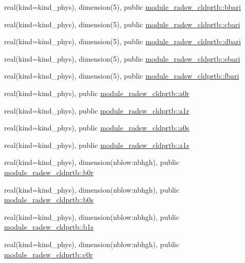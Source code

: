\begin{DoxyCompactItemize}
\item 
real(kind=kind\+\_\+phys), dimension(5), public \hyperlink{group__module__radsw__main_gad5342321ccd4759cb70f7a673620ee19}{module\+\_\+radsw\+\_\+cldprtb\+::bbari}
\item 
real(kind=kind\+\_\+phys), dimension(5), public \hyperlink{group__module__radsw__main_gae7f1de5c9736894ac7b54c0e0d312f16}{module\+\_\+radsw\+\_\+cldprtb\+::cbari}
\item 
real(kind=kind\+\_\+phys), dimension(5), public \hyperlink{group__module__radsw__main_gaf8b02590603ea2f838d954cb0a93bbeb}{module\+\_\+radsw\+\_\+cldprtb\+::dbari}
\item 
real(kind=kind\+\_\+phys), dimension(5), public \hyperlink{group__module__radsw__main_ga3cc7ab844ca564bd3df02a687bbc2f43}{module\+\_\+radsw\+\_\+cldprtb\+::ebari}
\item 
real(kind=kind\+\_\+phys), dimension(5), public \hyperlink{group__module__radsw__main_gac2e5b61aea6effe7d49586bf5223c154}{module\+\_\+radsw\+\_\+cldprtb\+::fbari}
\item 
real(kind=kind\+\_\+phys), public \hyperlink{group__module__radsw__main_ga0fdb9425031a10735e11d7f5c9e0376e}{module\+\_\+radsw\+\_\+cldprtb\+::a0r}
\item 
real(kind=kind\+\_\+phys), public \hyperlink{group__module__radsw__main_ga9826a0616c434620200ce4652b5af800}{module\+\_\+radsw\+\_\+cldprtb\+::a1r}
\item 
real(kind=kind\+\_\+phys), public \hyperlink{group__module__radsw__main_ga81ba576e28e5844772d040ff7543faae}{module\+\_\+radsw\+\_\+cldprtb\+::a0s}
\item 
real(kind=kind\+\_\+phys), public \hyperlink{group__module__radsw__main_ga9bf8de06b96c5014ca7f21fd39d84257}{module\+\_\+radsw\+\_\+cldprtb\+::a1s}
\item 
real(kind=kind\+\_\+phys), dimension(nblow\+:nbhgh), public \hyperlink{group__module__radsw__main_gac39d49e73ffa960421e36e45a35db162}{module\+\_\+radsw\+\_\+cldprtb\+::b0r}
\item 
real(kind=kind\+\_\+phys), dimension(nblow\+:nbhgh), public \hyperlink{group__module__radsw__main_ga391fbdda62f6fba95e105c2041e16880}{module\+\_\+radsw\+\_\+cldprtb\+::b0s}
\item 
real(kind=kind\+\_\+phys), dimension(nblow\+:nbhgh), public \hyperlink{group__module__radsw__main_ga2d2296e76fb85b66bd4583bcb9fa271b}{module\+\_\+radsw\+\_\+cldprtb\+::b1s}
\item 
real(kind=kind\+\_\+phys), dimension(nblow\+:nbhgh), public \hyperlink{group__module__radsw__main_ga8927b6e7cc810301e3843eb0f5c0c795}{module\+\_\+radsw\+\_\+cldprtb\+::c0r}

\end{DoxyCompactItemize}
